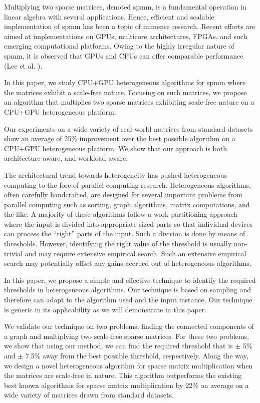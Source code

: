Multiplying two sparse matrices, denoted spmm, is a fundamental operation in linear algebra with several applications. Hence, efficient and scalable implementation of spmm has been a topic of immense research. Recent efforts are aimed at implementations on GPUs, multicore architectures, FPGAs, and such emerging computational platforms. Owing to the highly irregular nature of spmm, it is observed that GPUs and CPUs can offer comparable performance (Lee et al. \cite{lee}). 

In this paper, we study CPU+GPU heterogeneous algorithms for spmm where the matrices exhibit a scale-free nature. Focusing on such matrices, we propose an algorithm that multiplies two sparse matrices exhibiting scale-free nature  on a CPU+GPU heterogeneous platform.

Our experiments on a wide variety of real-world matrices from
standard datasets show an average of 25\% improvement over the best possible algorithm on a CPU+GPU heterogeneous platform. We show that  our approach is both architecture-aware, and workload-aware.

The architectural trend towards heterogeneity has
pushed heterogeneous computing to the fore of parallel computing
research. Heterogeneous algorithms, often carefully handcrafted,
are designed for several important problems from
parallel computing such as sorting, graph algorithms, matrix
computations, and the like. A majority of these algorithms follow
a work partitioning approach where the input is divided into
appropriate sized parts so that individual devices can process the
“right” parts of the input. Such a division is done by means of
thresholds. However, identifying the right value of the threshold is
usually non-trivial and may require extensive empirical search.
Such an extensive empirical search may potentially offset any
gains accrued out of heterogeneous algorithms.


In this paper, we propose a simple and effective technique
to identify the required thresholds in heterogeneous algorithms.
Our technique is based on sampling and therefore can adapt
to the algorithm used and the input instance. Our technique is
generic in its applicability as we will demonstrate in this paper.


We validate our technique on two problems: finding the
connected components of a graph and multiplying two scale-free
sparse matrices. For these two problems, we show that using our
method, we can find the required threshold that is $\pm$ 5\% and $\pm$ 7.5\% away from the best possible threshold, respectively. Along the way, we design a novel heterogeneous algorithm for sparse
matrix multiplication when the matrices are scale-free in nature.
This algorithm outperforms the existing best known algorithms
for sparse matrix multiplication by 22\% on average on a wide
variety of matrices drawn from standard datasets.

